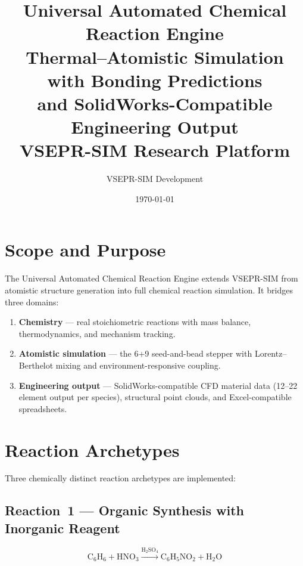 \documentclass[11pt,a4paper]{article}
\title{%
    \vspace{-1cm}
    \textbf{Universal Automated Chemical Reaction Engine}\\[0.3cm]
    \large Thermal--Atomistic Simulation with Bonding Predictions\\
    and SolidWorks-Compatible Engineering Output\\[0.2cm]
    \normalsize VSEPR-SIM Research Platform
}
\author{VSEPR-SIM Development}
\date{\today}
\begin{document}
\maketitle
\thispagestyle{fancy}

\section{Scope and Purpose}
\label{sec:scope}

The Universal Automated Chemical Reaction Engine extends VSEPR-SIM from
atomistic structure generation into full chemical reaction simulation.  It
bridges three domains:

\begin{enumerate}[label=(\alph*)]
    \item \textbf{Chemistry} --- real stoichiometric reactions with mass balance,
          thermodynamics, and mechanism tracking.
    \item \textbf{Atomistic simulation} --- the 6+9 seed-and-bead stepper
          with Lorentz--Berthelot mixing and environment-responsive coupling.
    \item \textbf{Engineering output} --- SolidWorks-compatible CFD material
          data (12--22 element output per species), structural point clouds,
          and Excel-compatible spreadsheets.
\end{enumerate}

\section{Reaction Archetypes}
\label{sec:archetypes}

Three chemically distinct reaction archetypes are implemented:

\subsection{Reaction~1 --- Organic Synthesis with Inorganic Reagent}

\begin{equation}
    \text{C}_6\text{H}_6 + \text{HNO}_3
    \xrightarrow{\text{H}_2\text{SO}_4}
    \text{C}_6\text{H}_5\text{NO}_2 + \text{H}_2\text{O}
    \label{eq:nitration}
\end{equation}
\end{document}
